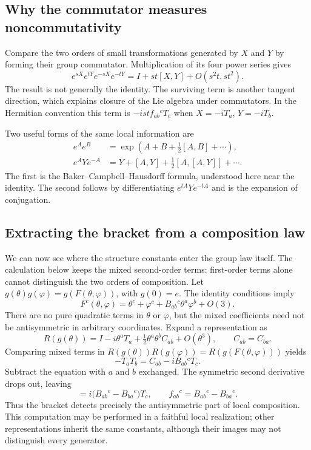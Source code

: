 \documentclass[11pt]{article}
\begin{document}
\subsection{Why the commutator measures noncommutativity}
Compare the two orders of small transformations generated by \(X\) and
\(Y\) by forming their group commutator. Multiplication of its four power
series gives
\begin{equation}
 e^{sX}e^{tY}e^{-sX}e^{-tY}
 =I+st[X,Y]+O(s^2t,st^2).
 \label{eq:group-commutator}
\end{equation}
The result is not generally the identity. The surviving term is another
tangent direction, which explains closure of the Lie algebra under
commutators. In the Hermitian convention this term is
\(-ist f_{ab}{}^cT_c\) when \(X=-iT_a\), \(Y=-iT_b\).

Two useful forms of the same local information are
\begin{align}
 e^Ae^B&=\exp\!\left(A+B+\tfrac12[A,B]+\cdots\right),
 \label{eq:bch}\\
 e^AYe^{-A}&=Y+[A,Y]+\tfrac12[A,[A,Y]]+\cdots.
 \label{eq:conjugation}
\end{align}
The first is the Baker--Campbell--Hausdorff formula, understood here near
the identity. The second follows by differentiating
\(e^{tA}Ye^{-tA}\) and is the expansion of conjugation.

\subsection{Extracting the bracket from a composition law}
We can now see where the structure constants enter the group law itself.
The calculation below keeps the mixed second-order terms: first-order
terms alone cannot distinguish the two orders of composition. Let \(g(\theta)g(\varphi)=g(F(\theta,\varphi))\), with
\(g(0)=e\). The identity conditions imply
\begin{equation}
 F^c(\theta,\varphi)=\theta^c+\varphi^c+
 B_{ab}{}^c\theta^a\varphi^b+O(3).
 \label{eq:coordinate-composition}
\end{equation}
There are no pure quadratic terms in \(\theta\) or \(\varphi\), but the
mixed coefficients need not be antisymmetric in arbitrary coordinates.
Expand a representation as
\[
 R(g(\theta))=I-i\theta^aT_a+
 \tfrac12\theta^a\theta^b C_{ab}+O(\theta^3),
 \qquad C_{ab}=C_{ba}.
\]
Comparing mixed terms in
\(R(g(\theta))R(g(\varphi))=R(g(F(\theta,\varphi)))\) yields
\[
 -T_aT_b=C_{ab}-iB_{ab}{}^cT_c.
\]
Subtract the equation with \(a\) and \(b\) exchanged. The symmetric
second derivative drops out, leaving
\begin{equation}
 [T_a,T_b]=i\bigl(B_{ab}{}^c-B_{ba}{}^c\bigr)T_c,
 \qquad f_{ab}{}^c=B_{ab}{}^c-B_{ba}{}^c.
 \label{eq:structure-from-composition}
\end{equation}
Thus the bracket detects precisely the antisymmetric part of local
composition. This computation may be performed in a faithful local
realization; other representations inherit the same constants, although
their images may not distinguish every generator.
\end{document}
